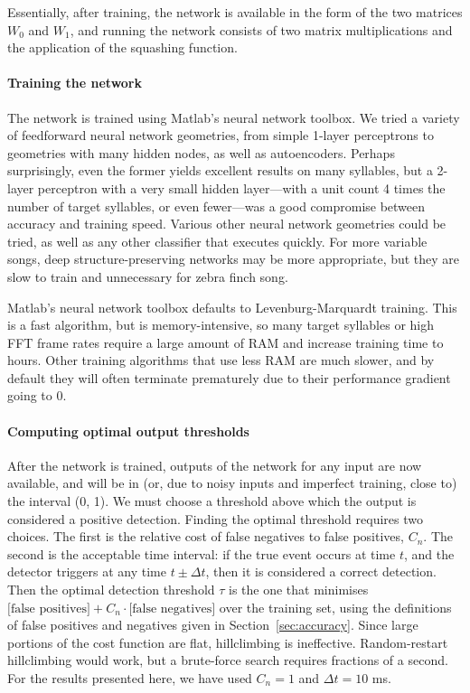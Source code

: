 \documentclass[10pt,letterpaper]{article}
\let\oldmarginpar\marginpar
\renewcommand{\marginpar}[1]{\oldmarginpar{\linespread{1}\scriptsize{#1}}}
\renewcommand{\subsubsection}[1]{\paragraph{#1}}
\begin{document}
Essentially, after training, the network is available in the form of the two matrices $W_0$ and $W_1$, and running the network consists of two matrix multiplications and the application of the squashing function.\marginpar{I've left out bias terms and some other details.  Ok?}

\subsubsection{Training the network}

The network is trained using Matlab's neural network toolbox. We tried
a variety of feedforward neural network geometries, from simple
1-layer perceptrons to geometries with many hidden
nodes, as well as autoencoders. Perhaps surprisingly, even the former yields excellent results
on many syllables, but a 2-layer perceptron with a very small hidden
layer---with a unit count 4 times the number of target
syllables, or even fewer---was a good compromise between accuracy and training
speed. Various other neural network geometries could be tried, as well
as any other classifier that executes quickly.  For more variable
songs, deep structure-preserving networks may be more appropriate, but
they are slow to train and unnecessary for zebra finch song.

Matlab's neural network toolbox defaults to Levenburg-Marquardt
training. This is a fast algorithm, but is memory-intensive, so
many target syllables or high FFT frame rates require a large
amount of RAM and increase training time to hours. Other training
algorithms that use less RAM are much slower, and by default they will
often terminate prematurely due to their performance gradient
going to 0.

\subsubsection{Computing optimal output thresholds}
\label{sec:optimalthresholds}
After the network is trained, outputs of the network for any input
are now available, and will be in (or, due to noisy inputs and imperfect training, close to) the
interval (0, 1). We must choose a threshold above which the output is
considered a positive detection. Finding the optimal threshold
requires two choices. The first is the relative cost of false
negatives to false positives, $C_n$. The second is the acceptable time
interval: if the true event occurs at time $t$, and the detector
triggers at any time $t\pm\Delta t$, then it is considered a correct
detection. Then the optimal detection threshold $\tau$ is the one that
minimises $\mbox{[false positives]} +C_n\cdot\mbox{[false negatives]}$
over the training set, using the definitions of false positives and
negatives given in Section~\ref{sec:accuracy}. Since large
portions of the cost function are flat, hillclimbing is ineffective.  Random-restart hillclimbing
would work, but a brute-force search requires fractions of a
second. For the results presented here, we have used $C_n=1$ and $\Delta t=10$ ms.
\end{document}

